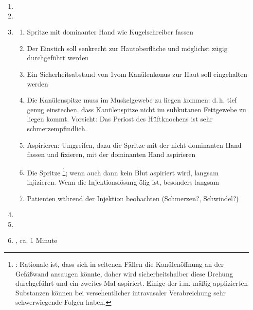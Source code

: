 \begin{FamPropHandlungsschritte}
\begin{enumerate}
\begin{enumerate}
    Muttermalen oder anderen Hautunreinheiten merken
    \item Niemals mit dem Fingernagel direkt die Injektionsstelle
    markieren (stattdessen wenn notwendig sterilisierte
    Sonde (Kanüle) wählen oder um Einstichstelle herum markieren)
  \end{enumerate}
  \item {}
  \item {}
  \item {}
  \begin{enumerate}
    \item Spritze mit dominanter Hand wie Kugelschreiber fassen
    \item Der Einstich soll senkrecht zur Hautoberfläche und möglichst zügig
    durchgeführt werden
    \item Ein Sicherheitsabstand von 1\CM* vom Kanülenkonus zur Haut soll
    eingehalten werden
    \item Die Kanülenspitze muss im Muskelgewebe zu liegen kommen: d.\,h.
    tief genug einstechen, dass Kanülenspitze nicht im subkutanen
    Fettgewebe zu liegen kommt. Vorsicht: Das Periost des Hüftknochens
    ist sehr schmerzempfindlich.
    \item Aspirieren: Umgreifen, dazu die Spritze mit der nicht dominanten Hand
    fassen und fixieren, mit der dominanten Hand aspirieren
    \item Die Spritze \footnote{: Rationale ist, dass sich in
    seltenen Fällen die Kanülenöffnung an der Gefäßwand
    ansaugen könnte, daher wird sicherheitshalber diese
    Drehung durchgeführt und ein zweites Mal aspiriert.
    Einige der i.m.-mäßig applizierten Substanzen können
    bei versehentlicher intravasaler Verabreichung sehr
    schwerwiegende Folgen haben.}; wenn auch dann kein Blut
    aspiriert wird, langsam injizieren. Wenn die
    Injektionslösung ölig ist, besonders langsam \item
    Patienten während der Injektion beobachten (Schmerzen?,
    Schwindel?)
  \end{enumerate}
  \item {}
  \item {}
  \item {}, ca. 1 Minute

\end{enumerate}
\end{FamPropHandlungsschritte}
